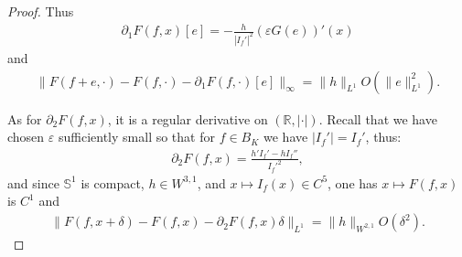 \documentclass[12pt]{article}
\newcommand{\eps}{\varepsilon}
\theoremstyle{plain}
\begin{document}
{\begin{proof}
Thus 
\begin{align}\label{eqdunf}
    \partial_1F(f,x)[e]=-\frac{h}{|I_{f}'|^2}(\eps G(e))'(x)
\end{align}
and
\begin{align}\label{eq:partialf}
\|F(f+e,\cdot)-F(f,\cdot)-\partial_1F(f,\cdot)[e]\|_\infty=\|h\|_{L^1}O(\|e\|_{L^1}^2).
\end{align}


As for $\partial_2F(f,x)$, it is a regular derivative on $(\mathbb R,|\cdot|)$. Recall that we have chosen $\eps$ sufficiently small so that  for $f\in B_K$ we have $|I_f'|=I_f'$, thus:
\begin{align}\label{eqddeuxf}
    \partial_2F(f,x)=\frac{h'I_f'-hI_f''}{I_f'^2},
\end{align}
and since $\mathbb S^1$ is compact, $h\in W^{3,1}$, and $x\mapsto I_f(x)\in C^5$, one has $x\mapsto F(f,x)$ is $C^1$ and 
\begin{align*}
\|F(f,x+\delta)-F(f,x)-\partial_2F(f,x)\delta\|_{L^1}=\|h\|_{W^{2,1}}O(\delta^2).    
\end{align*}


\end{proof}}
\end{document}
